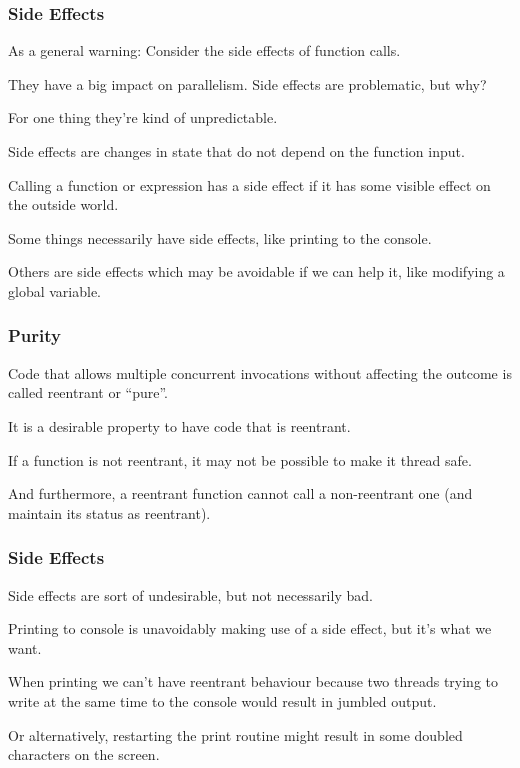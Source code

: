 \begin{frame}
\frametitle{Side Effects}

As a general warning: Consider the \alert{side effects} of function calls. 

They have a big impact on parallelism. Side effects are problematic, but why? 

For one thing they're kind of unpredictable. 

Side effects are changes in state that do not depend on the function input. 

Calling a function or expression has a side effect if it has some visible effect on the outside world. 

Some things necessarily have side effects, like printing to the console. 

Others are side effects which may be avoidable if we can help it, like modifying a global variable.

\end{frame}



\begin{frame}
\frametitle{Purity}

Code that allows multiple concurrent invocations without affecting the outcome is called reentrant or ``pure''. 

It is a desirable property to have code that is reentrant. 

If a function is not reentrant, it may not be possible to make it thread safe. 

And furthermore, a reentrant function cannot call a non-reentrant one (and maintain its status as reentrant).

\end{frame}



\begin{frame}
\frametitle{Side Effects}

Side effects are sort of undesirable, but not necessarily bad. 

Printing to console is unavoidably making use of a side effect, but it's what we want. 

When printing we can't have reentrant behaviour because two threads trying to write at the same time to the console would result in jumbled output. 

Or alternatively, restarting the print routine might result in some doubled characters on the screen.

\end{frame}



